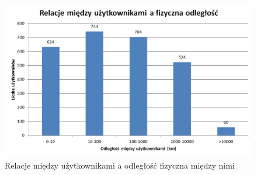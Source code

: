 \begin{figure}[ht!]
\centering
\includegraphics[width=120mm]{img/relacje-a-odleglosc.png}
\caption{Relacje między użytkownikami a odległość fizyczna między nimi}
\label{image:relacje-a-odleglosc}
\end{figure}





